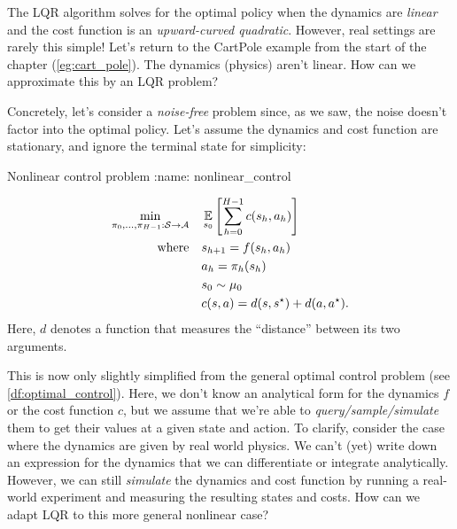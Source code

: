 \documentclass[\main/main]{subfiles}
\begin{document}
The LQR algorithm solves for the optimal policy when the dynamics are \emph{linear} and the cost function is an \emph{upward-curved quadratic}.
However, real settings are rarely this simple!
Let's return to the CartPole example from the start of the chapter (\autoref{eg:cart_pole}).
The dynamics (physics) aren't linear. How can we approximate this by an LQR problem?

Concretely, let's consider a \emph{noise-free} problem since, as we saw, the noise doesn't factor into the optimal policy. Let's assume the dynamics and cost function are stationary, and ignore the terminal state for simplicity:

\begin{definition}{Nonlinear control problem}
:name: nonlinear_control

    \begin{align*}
        \min_{\pi_0, \dots, \pi_{H-1} : \mathcal{S} \to \mathcal{A}} \quad & \operatorname*{\mathbb{E}}_{s_0} \left[ \sum_{h=0}^{H-1} c(s_h, a_h) \right] \\
        \text{where} \quad                                  & s_{h+1} = f(s_h, a_h)                                   \\
                                                            & a_h = \pi_h(s_h)                                          \\
                                                            & s_0 \sim \mu_0                                                     \\
                                                            & c(s, a) = d(s, s^\star) + d(a, a^\star).
    \end{align*}
    Here, $d$ denotes a function that measures the ``distance'' between its two arguments.
\end{definition}

This is now only slightly simplified from the general optimal control problem (see \ref{df:optimal_control}). Here, we don't know an analytical form for the dynamics $f$ or the cost function $c$,
but we assume that we're able to \emph{query/sample/simulate} them to get their values at a given state and action.
To clarify, consider the case where the dynamics are given by real world physics.
We can't (yet) write down an expression for the dynamics that we can differentiate or integrate analytically.
However, we can still \emph{simulate} the dynamics and cost function by running a real-world experiment and measuring the resulting states and costs.
How can we adapt LQR to this more general nonlinear case?
\end{document}
